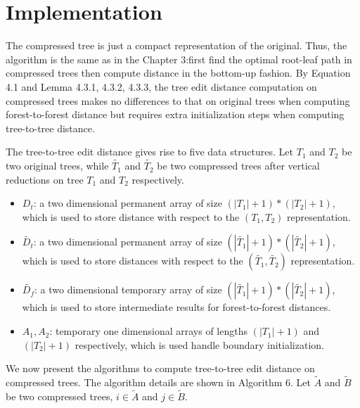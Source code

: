 \section{Implementation}
The compressed tree is just a compact representation of the original. Thus, the algorithm is the same as in the Chapter 3:first find the optimal root-leaf path in compressed trees then compute distance in the bottom-up fashion. By Equation 4.1 and Lemma 4.3.1, 4.3.2, 4.3.3, the tree edit distance computation on compressed trees makes no differences to that on original trees when computing forest-to-forest distance but requires extra initialization steps when computing tree-to-tree distance. 

The tree-to-tree edit distance gives rise to five data structures. Let $T_1$ and $T_2$ be two original trees, while $\widetilde{T_1}$ and $\widetilde{T_2}$ be two compressed trees after vertical reductions on tree $T_1$ and $T_2$ respectively.
\begin{itemize}
\item $D_t$: a two dimensional permanent array of size $(\left\vert T_1 \right\vert + 1) * (\left\vert T_2 \right\vert + 1)$, which is used to store distance with respect to the $(T_1, T_2)$ representation.
\item $\widetilde{D_t}$: a two dimensional permanent array of size $(\left\vert \widetilde{T_1 }\right\vert + 1) * (\left\vert \widetilde{T_2} \right\vert + 1)$, which is used to store distances with respect to the $(\widetilde{T_1}, \widetilde{T_2})$ representation. 
\item $\widetilde{D_f}$: a two dimensional temporary array of size $(\left\vert \widetilde{T_1 }\right\vert + 1) * (\left\vert \widetilde{T_2} \right\vert + 1)$, which is used to store intermediate results for forest-to-forest distances.
\item $A_1, A_2$: temporary one dimensional arrays of lengths $(\left\vert T_1 \right\vert + 1)$ and $(\left\vert T_2 \right\vert + 1)$ respectively, which is used handle boundary initialization. 
\end{itemize}

We now present the algorithms to compute tree-to-tree edit distance on compressed trees. The algorithm details are shown in Algorithm 6. Let $\widetilde{A}$ and $\widetilde{B}$ be two compressed trees, $i \in \widetilde{A}$ and $j \in \widetilde{B}$.

